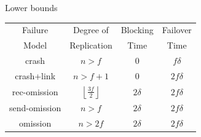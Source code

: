 \begin{frame}{Lower bounds}
	
\begin{table}
\begin{tabular}{|c|c|c|c|}
\hline
Failure & Degree of & Blocking & Failover \\
Model & Replication & Time     & Time \\
\hline
crash & $n>f$ & $0$ & $f\delta$ \\
\hline
crash+link & $n > f+1$ & $0$ & $2f\delta$ \\
\hline	
rec-omission & $\left\lfloor \frac{3f}{2} \right\rfloor$ & $2\delta$ & $2f\delta$ \\
\hline
send-omission & $n>f$ & $2\delta$ & $2f\delta$ \\
\hline
omission & $n>2f$ & $2\delta$ & $2f\delta$ \\
\hline
\end{tabular}
\end{table}

\end{frame}

